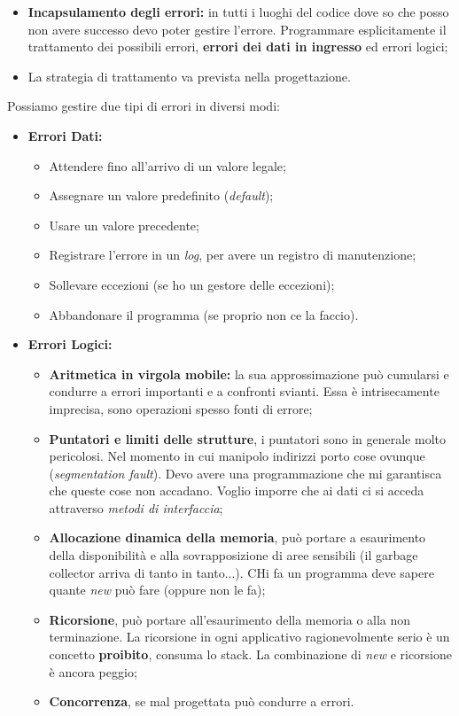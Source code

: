 \begin{itemize}

	\item \textbf{Incapsulamento degli errori:} in tutti i luoghi del codice dove so che posso non avere successo devo poter gestire l'errore. Programmare esplicitamente il trattamento dei possibili errori, \textbf{errori dei dati in ingresso} ed errori logici;
	\item La strategia di trattamento va prevista nella progettazione.

\end{itemize}
Possiamo gestire due tipi di errori in diversi modi:
\begin{itemize}

	\item \textbf{Errori Dati:}

	\begin{itemize}

		\item Attendere fino all'arrivo di un valore legale;
		\item Assegnare un valore predefinito (\textit{default});
		\item Usare un valore precedente;
		\item Registrare l'errore in un \textit{log}, per avere un registro di manutenzione;
		\item Sollevare eccezioni (se ho un gestore delle eccezioni);
		\item Abbandonare il programma (se proprio non ce la faccio).

	\end{itemize}
	
	\item \textbf{Errori Logici:}


	\begin{itemize}

		\item \textbf{Aritmetica in virgola mobile:} la sua approssimazione può cumularsi e condurre a errori importanti e a confronti svianti. Essa è intrisecamente imprecisa, sono operazioni spesso fonti di errore;
		\item \textbf{Puntatori e limiti delle strutture}, i puntatori sono in generale molto pericolosi. Nel momento in cui manipolo indirizzi porto cose ovunque (\textit{segmentation fault}). Devo avere una programmazione che mi garantisca che queste cose non accadano. Voglio imporre che ai dati ci si acceda attraverso \textit{metodi di interfaccia};
		\item \textbf{Allocazione dinamica della memoria}, può portare a esaurimento della disponibilità e alla sovrapposizione di aree sensibili (il garbage collector arriva di tanto in tanto...). CHi fa un programma deve sapere quante \textit{new} può fare (oppure non le fa);
		\item \textbf{Ricorsione}, può portare all'esaurimento della memoria o alla non terminazione. La ricorsione in ogni applicativo ragionevolmente serio è un concetto \textbf{proibito}, consuma lo stack. La combinazione di \textit{new} e ricorsione è ancora peggio;
		\item \textbf{Concorrenza}, se mal progettata può condurre a errori.

	\end{itemize}
\end{itemize}



